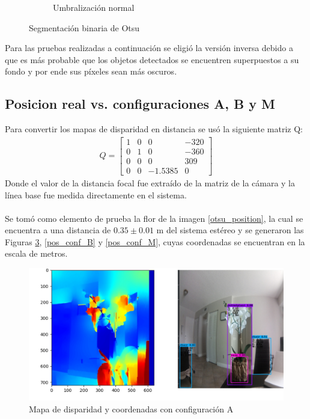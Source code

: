 \begin{figure}[H]
\begin{subfigure}[b]{0.4\textwidth}
        \caption{Umbralización normal}
        \label{otsu_normal}
     \end{subfigure}
\caption{Segmentación binaria de Otsu}
\label{OTSU_segmentation}
\end{figure}
Para las pruebas realizadas a continuación se eligió la versión inversa debido a que es más probable que los objetos detectados se encuentren superpuestos a su fondo y por ende sus píxeles sean más oscuros.
\subsection{Posicion real vs. configuraciones A, B y M}
Para convertir los mapas de disparidad en distancia se usó la siguiente matriz Q:
\begin{align}
    Q = \begin{bmatrix}
            1 & 0 & 0 & -320\\
            0 & 1 & 0 & -360\\
            0 & 0 & 0 & 309\\
            0 & 0 & -1.5385 & 0
            \end{bmatrix}
\end{align}
Donde el valor de la distancia focal fue extraído de la matriz de la cámara y la línea base fue medida directamente en el sistema.
\\
\\
Se tomó como elemento de prueba la flor de la imagen \ref{otsu_position}, la cual se encuentra a una distancia de $0.35 \pm 0.01$ m del sistema estéreo y se generaron las Figuras \ref{pos_conf_A}, \ref{pos_conf_B} y \ref{pos_conf_M}, cuyas coordenadas se encuentran en la escala de metros.
\begin{figure}[H]
    \centering
    \includegraphics[scale=0.5]{Recursos/position_configuration_A.jpg}
    \caption{Mapa de disparidad y coordenadas con configuración A}
    \label{pos_conf_A}
\end{figure}
